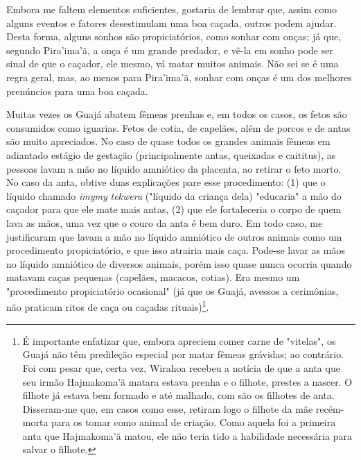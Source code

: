Embora me faltem elementos suficientes, gostaria de lembrar que, assim
como alguns eventos e fatores desestimulam uma boa caçada, outros podem
ajudar. Desta forma, alguns sonhos são propiciatórios, como sonhar com
onças; já que, segundo Pira'ima'ã, a onça é um grande predador, e vê-la
em sonho pode ser sinal de que o caçador, ele mesmo, vá matar muitos
animais. Não sei se é uma regra geral, mas, ao menos para Pira'ima'ã,
sonhar com onças é um dos melhores prenúncios para uma boa caçada.

Muitas vezes os Guajá abatem fêmeas prenhas e, em todos os casos, os
fetos são consumidos como iguarias. Fetos de cotia, de capelães, além de
porcos e de antas são muito apreciados. No caso de quase todos os
grandes animais fêmeas em adiantado estágio de gestação (principalmente
antas, queixadas e caititus), as pessoas lavam a mão no líquido
amniótico da placenta, ao retirar o feto morto. No caso da anta, obtive
duas explicações pare esse procedimento: (1) que o líquido chamado
\emph{imymy} \emph{tekwera} ("líquido da criança dela) "educaria" a mão
do caçador para que ele mate mais antas, (2) que ele fortaleceria o
corpo de quem lava as mãos, uma vez que o couro da anta é bem duro. Em
todo caso, me justificaram que lavam a mão no líquido amniótico de
outros animais como um procedimento propiciatório, e que isso atrairia
mais caça. Pode-se lavar as mãos no líquido amniótico de diversos
animais, porém isso quase nunca ocorria quando matavam caças pequenas
(capelães, macacos, cotias). Era mesmo um "procedimento propiciatório
ocasional" (já que os Guajá, avessos a cerimônias, não praticam ritos de
caça ou caçadas rituais)\footnote{É importante enfatizar que, embora
  apreciem comer carne de "vitelas", os Guajá não têm predileção
  especial por matar fêmeas grávidas; ao contrário. Foi com pesar que,
  certa vez, Wirahoa recebeu a notícia de que a anta que seu irmão
  Hajmakoma'ã matara estava prenha e o filhote, prestes a nascer. O
  filhote já estava bem formado e até malhado, com são os filhotes de
  anta. Disseram-me que, em casos como esse, retiram logo o filhote da
  mãe recém-morta para os tomar como animal de criação. Como aquela foi
  a primeira anta que Hajmakoma'ã matou, ele não teria tido a habilidade
  necessária para salvar o filhote.}.

